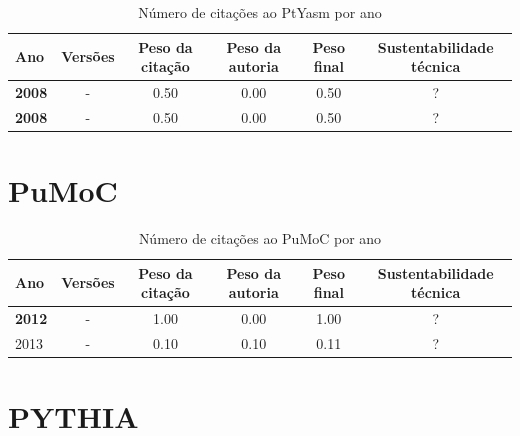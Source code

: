 \begin{table}[H]
\caption{Número de citações ao PtYasm por ano}
\centering
\begin{tabular}{| l | c | c | c | c | c |}
  \hline
  Ano & Versões & Peso da citação & Peso da autoria & Peso final & Sustentabilidade técnica \\
  \hline
            {\bf 2008}
          &
          -
          &
          0.50
          &
          0.00
          &
            {\color{blue} 0.50}
          &
          ?
          \\
            {\bf 2008}
          &
          -
          &
          0.50
          &
          0.00
          &
            {\color{blue} 0.50}
          &
          ?
          \\
\hline
\end{tabular}
\end{table}



\section{PuMoC}



\begin{table}[H]
\caption{Número de citações ao PuMoC por ano}
\centering
\begin{tabular}{| l | c | c | c | c | c |}
  \hline
  Ano & Versões & Peso da citação & Peso da autoria & Peso final & Sustentabilidade técnica \\
  \hline
            {\bf 2012}
          &
          -
          &
          1.00
          &
          0.00
          &
            {\color{blue} 1.00}
          &
          ?
          \\
\hline
            2013
          &
          -
          &
          0.10
          &
          0.10
          &
            {\color{red} 0.11}
          &
          ?
          \\
\hline
\end{tabular}
\end{table}



\section{PYTHIA}



